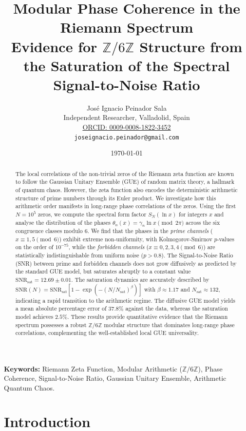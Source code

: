 \documentclass[12pt,a4paper]{article}
\title{\textbf{Modular Phase Coherence in the Riemann Spectrum}\\[0.5em]
\large Evidence for \(\mathbb{Z}/6\mathbb{Z}\) Structure from the Saturation of the Spectral Signal-to-Noise Ratio}
\author{José Ignacio Peinador Sala\\
\small Independent Researcher, Valladolid, Spain\\
\small \href{https://orcid.org/0009-0008-1822-3452}{ORCID: 0009-0008-1822-3452}\\
\small \texttt{joseignacio.peinador@gmail.com}}
\date{\today}
\theoremstyle{plain}
\theoremstyle{definition}
\theoremstyle{remark}
\begin{document}
\maketitle

\begin{abstract}
The local correlations of the non-trivial zeros of the Riemann zeta function are known to follow the Gaussian Unitary Ensemble (GUE) of random matrix theory, a hallmark of quantum chaos. However, the zeta function also encodes the deterministic arithmetic structure of prime numbers through its Euler product. We investigate how this arithmetic order manifests in long-range phase correlations of the zeros. Using the first \(N=10^5\) zeros, we compute the spectral form factor \(S_N(\ln x)\) for integers \(x\) and analyse the distribution of the phases \(\theta_n(x) = \gamma_n \ln x \pmod{2\pi}\) across the six congruence classes modulo \(6\). We find that the phases in the \emph{prime channels} (\(x \equiv 1,5 \pmod{6}\)) exhibit extreme non-uniformity, with Kolmogorov-Smirnov \(p\)-values on the order of \(10^{-75}\), while the \emph{forbidden channels} (\(x \equiv 0,2,3,4 \pmod{6}\)) are statistically indistinguishable from uniform noise (\(p > 0.8\)). The Signal-to-Noise Ratio (SNR) between prime and forbidden channels does not grow diffusively as predicted by the standard GUE model, but saturates abruptly to a constant value \(\mathrm{SNR}_{\mathrm{sat}} = 12.69 \pm 0.01\). The saturation dynamics are accurately described by \(\mathrm{SNR}(N) = \mathrm{SNR}_{\mathrm{sat}}[1 - \exp(-(N/N_{\mathrm{sat}})^\beta)]\) with \(\beta \approx 1.17\) and \(N_{\mathrm{sat}} \approx 132\), indicating a rapid transition to the arithmetic regime. The diffusive GUE model yields a mean absolute percentage error of \(37.8\%\) against the data, whereas the saturation model achieves \(2.5\%\). These results provide quantitative evidence that the Riemann spectrum possesses a robust \(\mathbb{Z}/6\mathbb{Z}\) modular structure that dominates long-range phase correlations, complementing the well-established local GUE universality.
\end{abstract}
\vspace{1em}
\noindent\textbf{Keywords:} Riemann Zeta Function, Modular Arithmetic (\(\mathbb{Z}/6\mathbb{Z}\)), Phase Coherence, Signal-to-Noise Ratio, Gaussian Unitary Ensemble, Arithmetic Quantum Chaos.

\section{Introduction}
\label{sec:introduction}
\end{document}
